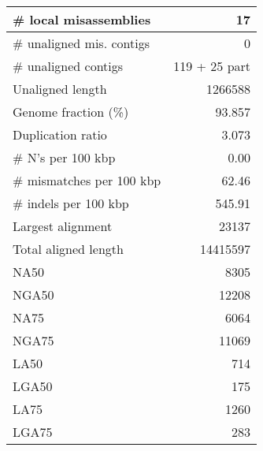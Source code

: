 \documentclass[12pt,a4paper]{article}
\begin{document}
\begin{table}[ht]
\begin{center}
\begin{tabular}{|l*{1}{|r}|}
\# local misassemblies & 17 \\ \hline
\# unaligned mis. contigs & 0 \\ \hline
\# unaligned contigs & 119 + 25 part \\ \hline
Unaligned length & 1266588 \\ \hline
Genome fraction (\%) & 93.857 \\ \hline
Duplication ratio & 3.073 \\ \hline
\# N's per 100 kbp & 0.00 \\ \hline
\# mismatches per 100 kbp & 62.46 \\ \hline
\# indels per 100 kbp & 545.91 \\ \hline
Largest alignment & 23137 \\ \hline
Total aligned length & 14415597 \\ \hline
NA50 & 8305 \\ \hline
NGA50 & 12208 \\ \hline
NA75 & 6064 \\ \hline
NGA75 & 11069 \\ \hline
LA50 & 714 \\ \hline
LGA50 & 175 \\ \hline
LA75 & 1260 \\ \hline
LGA75 & 283 \\ \hline
\end{tabular}
\end{center}
\end{table}
\end{document}
